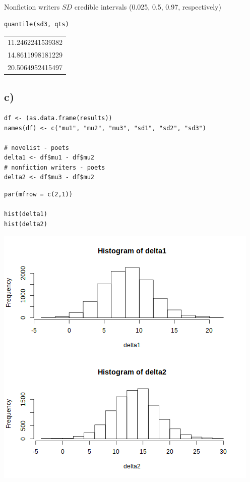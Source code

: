 \documentclass[11pt]{article}
\begin{document}
Nonfiction writers \(SD\) credible intervals (0.025, 0.5, 0.97, respectively)
\begin{verbatim}
quantile(sd3, qts)
\end{verbatim}

\begin{center}
\begin{tabular}{r}
11.2462241539382\\
14.8611998181229\\
20.5064952415497\\
\end{tabular}
\end{center}

\subsection*{c)}
\label{sec:org06583a8}

\begin{verbatim}
df <- (as.data.frame(results))
names(df) <- c("mu1", "mu2", "mu3", "sd1", "sd2", "sd3")

# novelist - poets
delta1 <- df$mu1 - df$mu2
# nonfiction writers - poets
delta2 <- df$mu3 - df$mu2

\end{verbatim}


\begin{verbatim}
par(mfrow = c(2,1))

hist(delta1)
hist(delta2)
\end{verbatim}

\begin{center}
\includegraphics[width=.9\linewidth]{hist2.png}
\end{center}
\end{document}
